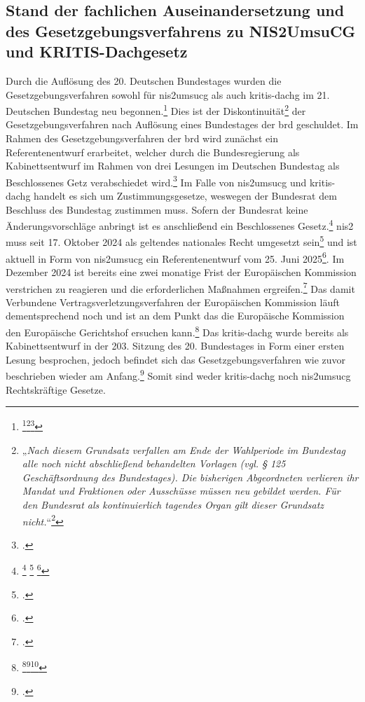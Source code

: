 \documentclass[11pt,a4paper,hidelinks]{article}   %
\begin{document}
        \subsection{Stand der fachlichen Auseinandersetzung und des Gesetzgebungsverfahrens zu NIS2UmsuCG und KRITIS-Dachgesetz}\label{subsec:AktuellerForschungsstand}
        Durch die Auflösung des 20. Deutschen Bundestages wurden die Gesetzgebungsverfahren sowohl für \gls{nis2umsucg} als auch \gls{kritis-dachg} im 21. Deutschen Bundestag neu begonnen.\footnote{\footcite[Vgl. §125,][]{BTGO}\footcite[Vgl. S. 1][]{brd:c54cf9}\footcite[Vgl. S. 52][]{brd:4a7cbe}} Dies ist der Diskontinuität\footnote{„\emph{Nach diesem Grundsatz verfallen am Ende der Wahlperiode im Bundestag alle noch nicht abschließend behandelten Vorlagen (vgl. § 125 Geschäftsordnung des Bundestages). Die bisherigen Abgeordneten verlieren ihr Mandat und Fraktionen oder Ausschüsse müssen neu gebildet werden. Für den Bundesrat als kontinuierlich tagendes Organ gilt dieser Grundsatz nicht.}“\footcite[Vgl. S. 1,][]{brd:33503f}} der Gesetzgebungsverfahren nach Auflösung eines Bundestages der \gls{brd} geschuldet. Im Rahmen des Gesetzgebungsverfahren der \gls{brd} wird zunächst ein Referentenentwurf erarbeitet, welcher durch die Bundesregierung als Kabinettsentwurf im Rahmen von drei Lesungen im Deutschen Bundestag als Beschlossenes Getz verabschiedet wird.\footcite[Vgl. S. 1][]{bmi:a4771a} Im Falle von \gls{nis2umsucg} und \gls{kritis-dachg} handelt es sich um Zustimmungsgesetze, weswegen der Bundesrat dem Beschluss des Bundestag zustimmen muss. Sofern der Bundesrat keine Änderungsvorschläge anbringt ist es anschließend ein Beschlossenes Gesetz.\footnote{
            \footcite[Vgl. Artikel 104a, Absatz 4,][]{GG}
            \footcite[Vgl. Artikel 84, Absatz 1 GG,][]{GG}
            \footcite[Vgl. S. 1][]{bmi:a4771a}
        }\medbreak
        \gls{nis2} muss seit 17. Oktober 2024 als geltendes nationales Recht umgesetzt sein\footcite[Vgl. Artikel 21, Absatz 5,][]{EU2022-2555} und ist aktuell in Form von \gls{nis2umsucg} ein Referentenentwurf vom 25. Juni 2025\footcite[Vgl. S. 2,][]{bmi:98905b}. Im Dezember 2024 ist bereits eine zwei monatige Frist der Europäischen Kommission verstrichen zu reagieren und die erforderlichen Maßnahmen ergreifen.\footcite[Vgl. S. 15,][]{eu:9274cb} Das damit Verbundene Vertragsverletzungsverfahren der Europäischen Kommission läuft dementsprechend noch und ist an dem Punkt das die Europäische Kommission den Europäische Gerichtshof ersuchen kann.\footnote{\footcite[Vgl. S. 2,][]{eu:4a7cbe}\footcite[Vgl. S. 2,][]{eu:376b82}\footcite[Vgl. S. 15,][]{eu:9274cb}} Das \gls{kritis-dachg} wurde bereits als Kabinettsentwurf in der 203. Sitzung des 20. Bundestages in Form einer ersten Lesung besprochen, jedoch befindet sich das Gesetzgebungsverfahren wie zuvor beschrieben wieder am Anfang.\footcite[Vgl. S. 26270 - 26280][]{brd:33503f} Somit sind weder \gls{kritis-dachg} noch \gls{nis2umsucg} Rechtskräftige Gesetze.\medbreak
\end{document}
